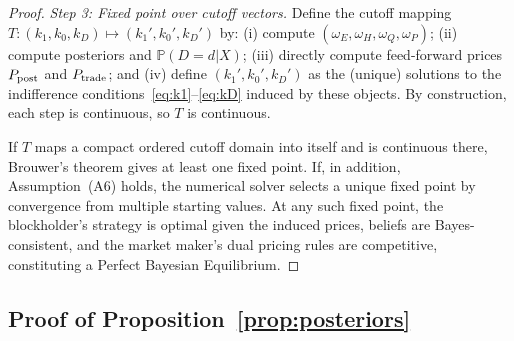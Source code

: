 \documentclass[11pt]{article}
\newcommand{\PP}{\mathbb{P}}
\newcommand{\1}{\mathbf{1}}
\begin{document}
\begin{proof}
\textit{Step 3: Fixed point over cutoff vectors.}
Define the cutoff mapping $T:(k_1,k_0,k_D)\mapsto(k_1',k_0',k_D')$ by: (i) compute $(\omega_E,\omega_H,\omega_Q,\omega_P)$; (ii) compute posteriors and $\PP(D=d|X)$; (iii) directly compute feed-forward prices $P_{\textup{post}}$ and $P_{\textup{trade}}$; and (iv) define $(k_1',k_0',k_D')$ as the (unique) solutions to the indifference conditions~\eqref{eq:k1}--\eqref{eq:kD} induced by these objects. By construction, each step is continuous, so $T$ is continuous.

If $T$ maps a compact ordered cutoff domain into itself and is continuous there, Brouwer's theorem gives at least one fixed point. If, in addition, Assumption~\textup{(A6)} holds, the numerical solver selects a unique fixed point by convergence from multiple starting values. At any such fixed point, the blockholder's strategy is optimal given the induced prices, beliefs are Bayes-consistent, and the market maker's dual pricing rules are competitive, constituting a Perfect Bayesian Equilibrium.
\end{proof}

\subsection{Proof of Proposition~\ref{prop:posteriors}}
\label{app:proof-posteriors}
\end{document}
